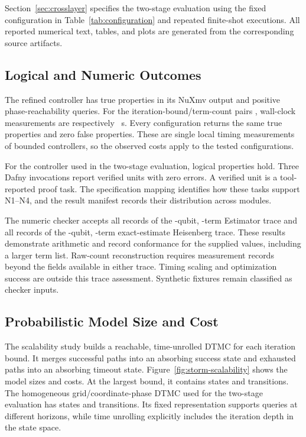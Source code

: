 \documentclass[conference]{IEEEtran}
\begin{document}
Section~\ref{sec:crosslayer} specifies the two-stage evaluation using the fixed configuration in Table~\ref{tab:configuration} and repeated finite-shot executions. All reported numerical text, tables, and plots are generated from the corresponding source artifacts.

\subsection{Logical and Numeric Outcomes}
The refined controller has \LegacyLogicalProperties true properties in its NuXmv output and \PhaseQueries positive phase-reachability queries. For the iteration-bound/term-count pairs \LogicalScalingPairs, wall-clock measurements are respectively \LogicalScalingTimes~s. Every configuration returns the same \LegacyLogicalProperties true properties and zero false properties. These are single local timing measurements of bounded controllers, so the observed costs apply to the tested configurations.

For the controller used in the two-stage evaluation, \LogicalProperties logical properties hold. Three Dafny invocations report \DafnyChecks verified units with zero errors. A verified unit is a tool-reported proof task. The specification mapping identifies how these tasks support N1--N4, and the result manifest records their distribution across modules.

The numeric checker accepts all \EstimatorRecords records of the \EstimatorQubits-qubit, \EstimatorTerms-term Estimator trace and all \HeisenbergRecords records of the \HeisenbergQubits-qubit, \HeisenbergTerms-term exact-estimate Heisenberg trace. These results demonstrate arithmetic and record conformance for the supplied values, including a larger term list. Raw-count reconstruction requires measurement records beyond the fields available in either trace. Timing scaling and optimization success are outside this trace assessment. Synthetic fixtures remain classified as checker inputs.

\subsection{Probabilistic Model Size and Cost}
\label{sec:modelcost}
The scalability study builds a reachable, time-unrolled DTMC for each iteration bound. It merges successful paths into an absorbing success state and exhausted paths into an absorbing timeout state. Figure~\ref{fig:storm-scalability} shows the model sizes and costs. At the largest bound, it contains \ScaleMaxStates states and \ScaleMaxTransitions transitions. The homogeneous grid/coordinate-phase DTMC used for the two-stage evaluation has \ModelStates states and \ModelTransitions transitions. Its fixed representation supports queries at different horizons, while time unrolling explicitly includes the iteration depth in the state space.
\end{document}
